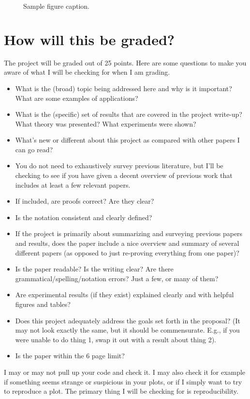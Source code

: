 \documentclass{article}
\begin{document}
\begin{figure}[t]
	\centering
	\fbox{\rule[-.5cm]{0cm}{4cm} \rule[-.5cm]{4cm}{0cm}}
	\caption{Sample figure caption.}
	\label{figure}
\end{figure}
	
	\section{How will this be graded?}
	The project will be graded out of 25 points. Here are some questions to make you aware of what I will be checking for when I am grading.
	
	\begin{itemize}
		\item What is the (broad) topic being addressed here and why is it important? What are some examples of applications?
		\item What is the (specific) set of results that are covered in the project write-up? What theory was presented? What experiments were shown?
		\item What's new or different about this project as compared with other papers I can go read? 
		\item You do not need to exhaustively survey previous literature, but I'll be checking to see if you have given a decent overview of previous work that includes at least a few relevant papers.
		\item If included, are proofs correct? Are they clear?
		\item Is the notation consistent and clearly defined?
		\item If the project is primarily about summarizing and surveying previous papers and results, does the paper include a nice overview and summary of several different papers (as opposed to just re-proving everything from one paper)?
		\item Is the paper readable? Is the writing clear? Are there grammatical/spelling/notation errors? Just a few, or many of them?
		\item Are experimental results (if they exist) explained clearly and with helpful figures and tables?
		\item Does this project adequately address the goals set forth in the proposal? (It may not look exactly the same, but it should be commensurate. E.g., if you were unable to do thing 1, swap it out with a result about thing 2).
		\item Is the paper within the 6 page limit?
	\end{itemize}
	I may or may not pull up your code and check it. I may also check it for example if something seems strange or suspicious in your plots, or if I simply want to try to reproduce a plot. The primary thing I will be checking for is reproducibility.
\end{document}

